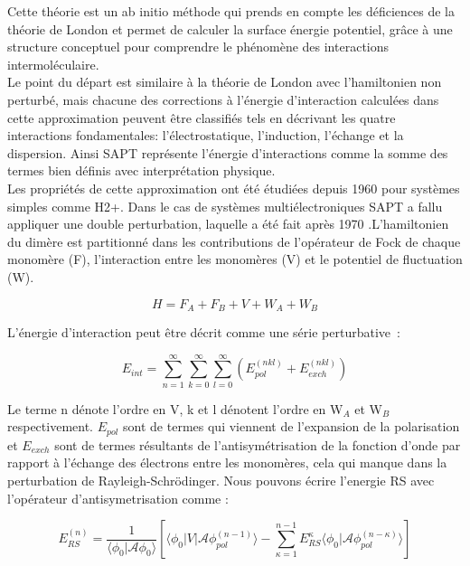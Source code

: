 Cette théorie est un ab initio méthode qui prends en compte les déficiences de la théorie de London et permet de calculer la surface énergie potentiel, grâce à une structure conceptuel pour comprendre le phénomène des interactions intermoléculaire.\\

Le point du départ est similaire à la théorie de London avec l'hamiltonien non perturbé, mais chacune des corrections à l’énergie d’interaction calculées dans cette approximation peuvent être classifiés tels en décrivant les quatre interactions fondamentales: l’électrostatique,  l’induction, l’échange et la dispersion. Ainsi SAPT représente l’énergie d’interactions comme la somme des termes bien définis avec interprétation physique.\\

Les propriétés de cette approximation ont été étudiées depuis 1960 pour systèmes simples comme H2+. Dans le cas de systèmes multiélectroniques SAPT a fallu appliquer une double perturbation, laquelle a été fait après 1970 \cite{szalewicz1979symmetry}.L’hamiltonien du dimère est partitionné dans les contributions de l’opérateur de Fock de chaque monomère (F), l’interaction entre les monomères (V) et le potentiel de fluctuation (W).

\begin{equation}
H = F_{A} + F_{B} + V + W_{A} + W_{B}
\end{equation}

L’énergie d’interaction peut être décrit comme une série perturbative :

\begin{equation}
E_{int} = \sum_{n=1}^{\infty} \sum_{k=0}^{\infty} \sum_{l=0}^{\infty} (E_{pol}^{(nkl)}+ E_{exch}^{(nkl)}) \label{serie}
\end{equation}

Le terme n dénote l’ordre en V, k et l dénotent l’ordre en W$_{A}$ et W$_{B}$ respectivement. $E_{pol}$ sont de termes qui viennent de l’expansion de la polarisation et $E_{exch}$ sont de termes résultants de l’antisymétrisation de la fonction d’onde par rapport à l’échange des électrons entre les monomères, cela qui manque dans la perturbation de Rayleigh-Schr\"{o}dinger. Nous pouvons écrire l'energie RS avec l'opérateur d'antisymetrisation comme :

\begin{equation}
E_{RS}^{(n)} = \frac{1}{\langle\phi_{0}|\mathscr{A}\phi_{0}\rangle} \left[\langle\phi_{0} | V| \mathscr{A} \phi_{pol}^{(n-1)}\rangle - \sum_{\kappa=1}^{n-1} E_{RS}^{\kappa} \langle \phi_{0}|\mathscr{A} \phi_{pol}^{(n-\kappa)}\rangle\right]
\end{equation}

